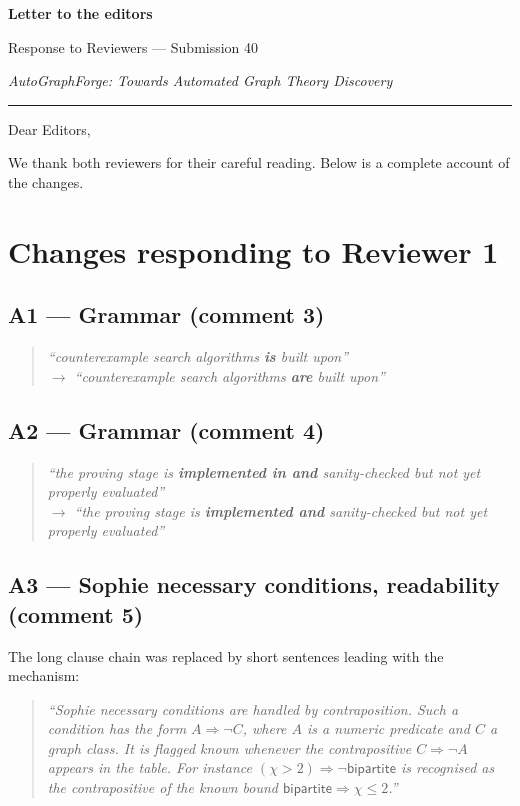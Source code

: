 \documentclass[11pt,a4paper]{article}
\newenvironment{chg}{%
  \begin{quote}\small\color{black!80}\itshape}{\end{quote}}
\begin{document}
\thispagestyle{empty}

{\Large\bfseries Letter to the editors}\par\medskip
{\large Response to Reviewers --- Submission 40}\par\smallskip
{\large\itshape AutoGraphForge: Towards Automated Graph Theory Discovery}
\par\bigskip\hrule\bigskip

Dear Editors,

We thank both reviewers for their careful reading. Below is a complete account of
the changes.

\section{Changes responding to Reviewer 1}

\subsection{A1 --- Grammar (comment 3)}
\begin{chg}
``counterexample search algorithms \textbf{is} built upon''\\
$\rightarrow$ ``counterexample search algorithms \textbf{are} built upon''
\end{chg}

\subsection{A2 --- Grammar (comment 4)}
\begin{chg}
``the proving stage is \textbf{implemented in and} sanity-checked but not yet properly evaluated''\\
$\rightarrow$ ``the proving stage is \textbf{implemented and} sanity-checked but not yet properly evaluated''
\end{chg}

\subsection{A3 --- Sophie necessary conditions, readability (comment 5)}
The long clause chain was replaced by short sentences leading with the mechanism:
\begin{chg}
``Sophie \emph{necessary conditions} are handled by contraposition. Such a
condition has the form $A \Rightarrow \neg C$, where $A$ is a numeric predicate
and $C$ a graph class. It is flagged known whenever the contrapositive
$C \Rightarrow \neg A$ appears in the table. For instance
$(\chi > 2) \Rightarrow \neg\textsf{bipartite}$ is recognised as the
contrapositive of the known bound $\textsf{bipartite} \Rightarrow \chi \le 2$.''
\end{chg}
\end{document}
